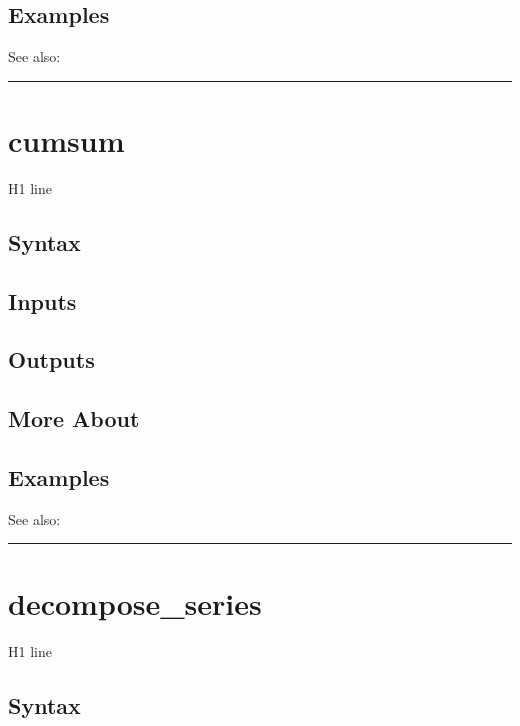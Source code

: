 \documentclass[letterpaper,10pt,english]{sphinxmanual}
\begin{document}
\subsection{Examples}
\label{classes/time_series/@ts/ts:id166}
See also:


\bigskip\hrule{}\bigskip



\section{cumsum}
\label{classes/time_series/@ts/ts:id167}\label{classes/time_series/@ts/ts:cumsum}
H1 line


\subsection{Syntax}
\label{classes/time_series/@ts/ts:id168}

\subsection{Inputs}
\label{classes/time_series/@ts/ts:id169}

\subsection{Outputs}
\label{classes/time_series/@ts/ts:id170}

\subsection{More About}
\label{classes/time_series/@ts/ts:id171}

\subsection{Examples}
\label{classes/time_series/@ts/ts:id172}
See also:


\bigskip\hrule{}\bigskip



\section{decompose\_series}
\label{classes/time_series/@ts/ts:id173}\label{classes/time_series/@ts/ts:decompose-series}
H1 line


\subsection{Syntax}
\label{classes/time_series/@ts/ts:id174}
\end{document}
